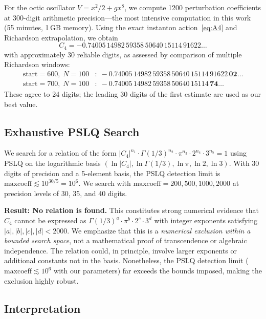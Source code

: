 \documentclass[12pt,a4paper]{article}
\numberwithin{equation}{section}
\theoremstyle{plain}
\theoremstyle{definition}
\theoremstyle{remark}
\begin{document}
For the octic oscillator $V = x^2/2 + gx^8$, we compute 1200
perturbation coefficients at 300-digit arithmetic precision---the most
intensive computation in this work (55 minutes, 1\,GB memory). Using
the exact instanton action~\eqref{eq:A4} and Richardson extrapolation,
we obtain
\begin{equation}\label{eq:C4-numerical}
  C_4 = -0.74005\,14982\,59358\,50640\,15114\,91622\ldots
\end{equation}
with approximately 30 reliable digits, as assessed by comparison of
multiple Richardson windows:
\begin{align*}
  \text{start}=600,\; N=100&:\; {-}0.74005\,14982\,59358\,50640\,15114\,91622\,\mathbf{02}\ldots \\
  \text{start}=700,\; N=100&:\; {-}0.74005\,14982\,59358\,50640\,15114\,\mathbf{74}\ldots
\end{align*}
These agree to 24 digits; the leading 30 digits of the first estimate
are used as our best value.

\subsection{Exhaustive PSLQ Search}
\label{sec:M4-PSLQ}

We search for a relation of the form
$|C_4|^{n_1} \cdot \Gamma(1/3)^{n_2} \cdot \pi^{n_3} \cdot 2^{n_4} \cdot 3^{n_5} = 1$
using PSLQ on the logarithmic basis
$(\ln|C_4|, \ln\Gamma(1/3), \ln\pi, \ln 2, \ln 3)$.
With 30 digits of precision and a 5-element basis, the PSLQ detection limit
is $\mathrm{maxcoeff} \lesssim 10^{30/5} = 10^6$.
We search with $\mathrm{maxcoeff} = 200, 500, 1000, 2000$ at precision
levels of 30, 35, and 40 digits.

\textbf{Result: No relation is found.} This constitutes strong numerical
evidence that $C_4$ cannot be expressed as
$\Gamma(1/3)^a \cdot \pi^b \cdot 2^c \cdot 3^d$ with integer exponents
satisfying $|a|, |b|, |c|, |d| < 2000$. We emphasize that this is a
\emph{numerical exclusion within a bounded search space}, not a mathematical
proof of transcendence or algebraic independence. The relation could, in
principle, involve larger exponents or additional constants not in the basis.
Nonetheless, the PSLQ detection limit ($\mathrm{maxcoeff} \lesssim 10^6$ with
our parameters) far exceeds the bounds imposed, making the exclusion highly
robust.

\subsection{Interpretation}
\label{sec:M4-interpretation}
\end{document}
